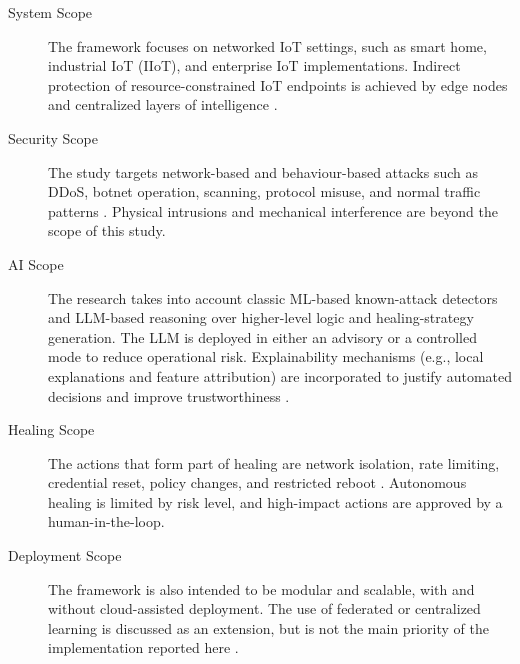 \begin{description}
	\item[System Scope] The framework focuses on networked IoT settings, such as smart home, industrial IoT (IIoT), and enterprise IoT implementations. Indirect protection of resource-constrained IoT endpoints is achieved by edge nodes and centralized layers of intelligence \cite{Bormann2014, Firouzi2025}.
	\item[Security Scope] The study targets network-based and behaviour-based attacks such as DDoS, botnet operation, scanning, protocol misuse, and normal traffic patterns \cite{Antonakakis2017, Jain2024, Cloudflare2025Q3}. Physical intrusions and mechanical interference are beyond the scope of this study.
	\item[AI Scope] The research takes into account classic ML-based known-attack detectors and LLM-based reasoning over higher-level logic and healing-strategy generation. The LLM is deployed in either an advisory or a controlled mode to reduce operational risk. Explainability mechanisms (e.g., local explanations and feature attribution) are incorporated to justify automated decisions and improve trustworthiness \cite{Lundberg2017, Oriaro2025, Tariq2025}.
	\item[Healing Scope] The actions that form part of healing are network isolation, rate limiting, credential reset, policy changes, and restricted reboot \cite{Jain2024}. Autonomous healing is limited by risk level, and high-impact actions are approved by a human-in-the-loop.
	\item[Deployment Scope] The framework is also intended to be modular and scalable, with and without cloud-assisted deployment. The use of federated or centralized learning is discussed as an extension, but is not the main priority of the implementation reported here \cite{McMahan2017, HernandezRamos2025}.
\end{description}


